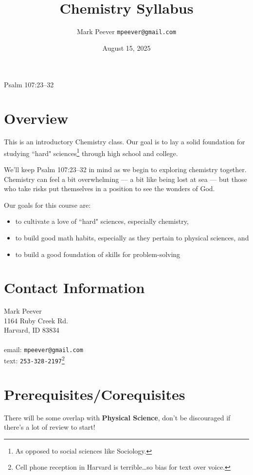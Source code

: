 \documentclass[11pt, oneside]{article}   	%
\title{Chemistry Syllabus}
\author{Mark Peever \texttt{mpeever@gmail.com}}
\date{August 15, 2025}
\begin{document}
\maketitle

\begin{center}
Psalm 107:23--32
\end{center}

\section{Overview}
This is an introductory Chemistry class. Our goal is to lay a solid foundation for studying ``hard" sciences\footnote{As opposed to social sciences like Sociology.} through high school and college. 

We'll keep Psalm 107:23--32 in mind as we begin to exploring chemistry together. Chemistry can feel a bit overwhelming --- a bit like being lost at sea --- but those who take risks put themselves in a position to see the wonders of God.

Our goals for this course are:
\begin{itemize}
\item to cultivate a love of ``hard" sciences, especially chemistry,
\item to build good math habits, especially as they pertain to physical sciences, and
\item to build a good foundation of skills for problem-solving
\end{itemize}

\section{Contact Information}
Mark Peever\\
1164 Ruby Creek Rd.\\
Harvard, ID 83834 \\
\\
email: \texttt{mpeever@gmail.com} \\
text: \texttt{253-328-2197}\footnote{Cell phone reception in Harvard is terrible\ldots so bias for text over voice.} \\

\section{Prerequisites/Corequisites}
There will be some overlap with \textbf{Physical Science}, don't be discouraged if there's a lot of review to start!
\end{document}
